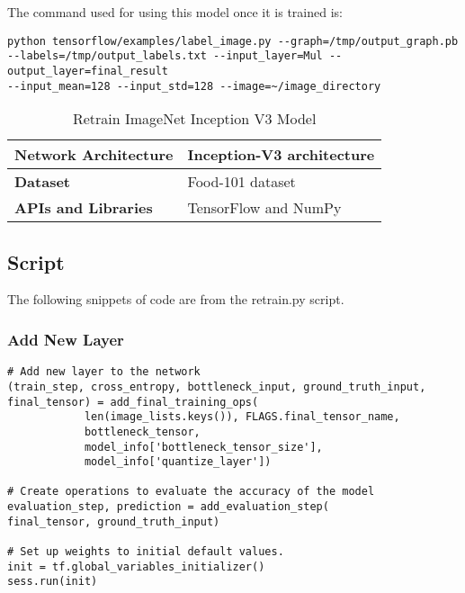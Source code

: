 The command used for using this model once it is trained is:
\begin{lstlisting}[style=Command]
python tensorflow/examples/label_image.py --graph=/tmp/output_graph.pb
--labels=/tmp/output_labels.txt --input_layer=Mul --output_layer=final_result
--input_mean=128 --input_std=128 --image=~/image_directory
\end{lstlisting}

\begin{table}[h]
\centering
\caption{Retrain ImageNet Inception V3 Model}
\label{my-label}
\begin{tabular}{|l|p{8cm}|}
\hline
\textbf{Network Architecture} & Inception-V3 architecture \parencite{inception}            \\ \hline
\textbf{Dataset}              & Food-101 dataset \\ \hline
\textbf{APIs and Libraries}   & TensorFlow and NumPy                                                        \\ \hline
\end{tabular}
\end{table}

\tocless\subsection{Script}
The following snippets of code are from the retrain.py script.

\tocless\subsubsection{Add New Layer}
\begin{lstlisting}[style=Python]
# Add new layer to the network
(train_step, cross_entropy, bottleneck_input, ground_truth_input,
final_tensor) = add_final_training_ops(
            len(image_lists.keys()), FLAGS.final_tensor_name,
            bottleneck_tensor,
            model_info['bottleneck_tensor_size'],
            model_info['quantize_layer'])
 
# Create operations to evaluate the accuracy of the model
evaluation_step, prediction = add_evaluation_step(
final_tensor, ground_truth_input)
 
# Set up weights to initial default values.
init = tf.global_variables_initializer()
sess.run(init)
\end{lstlisting}

